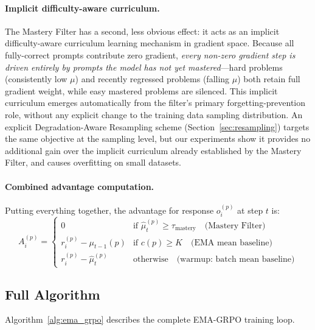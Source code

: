 \documentclass[11pt]{article}
\newcommand{\method}{EMA-GRPO}
\theoremstyle{definition}
\begin{document}
\paragraph{Implicit difficulty-aware curriculum.}
The Mastery Filter has a second, less obvious effect: it acts as an
implicit difficulty-aware curriculum learning mechanism in gradient space.
Because all fully-correct prompts contribute zero gradient, \emph{every
non-zero gradient step is driven entirely by prompts the model has not yet
mastered}---hard problems (consistently low $\mu$) and recently regressed
problems (falling $\mu$) both retain full gradient weight, while easy
mastered problems are silenced.
This implicit curriculum emerges automatically from the filter's primary
forgetting-prevention role, without any explicit change to the training
data sampling distribution.
An explicit Degradation-Aware Resampling scheme (Section~\ref{sec:resampling})
targets the same objective at the sampling level, but our experiments show
it provides no additional gain over the implicit curriculum already established
by the Mastery Filter, and causes overfitting on small datasets.

\paragraph{Combined advantage computation.}
Putting everything together, the advantage for response $o_i^{(p)}$ at step
$t$ is:
\begin{equation}
  A_i^{(p)} = \begin{cases}
    0
      & \text{if } \hat{\mu}_t^{(p)} \geq \tau_{\mathrm{mastery}}
        \quad\text{(Mastery Filter)}\\[4pt]
    r_i^{(p)} - \mu_{t-1}(p)
      & \text{if } c(p) \geq K
        \quad\text{(EMA mean baseline)}\\[4pt]
    r_i^{(p)} - \hat{\mu}_t^{(p)}
      & \text{otherwise}
        \quad\text{(warmup: batch mean baseline)}
  \end{cases}
  \label{eq:final_adv}
\end{equation}

\subsection{Full Algorithm}
\label{sec:algorithm}

Algorithm~\ref{alg:ema_grpo} describes the complete \method{} training loop.
\end{document}
